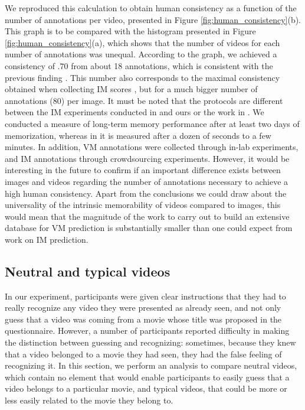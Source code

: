 \documentclass[sigconf]{acmart}
\begin{document}
We reproduced this calculation to obtain human consistency as a function of the number of annotations per video, presented in Figure \ref{fig:human_consistency}(b).
This graph is to be compared with the histogram presented in Figure \ref{fig:human_consistency}(a), which shows that the number of videos for each number of annotations was unequal.
According to the graph, we achieved a consistency of $.70$ from about 18 annotations, which is consistent with the previous finding \cite{han_2015_learning}.
This number also corresponds to the maximal consistency obtained when collecting IM scores \cite{isola_2011_makes,khosla_2015_understanding}, but for a much bigger number of annotations (80) per image.
It must be noted that the protocols are different between the IM experiments conducted in \cite{isola_2011_makes,khosla_2015_understanding} and ours or the work in \cite{han_2015_learning}.
We conducted a measure of long-term memory performance after at least two days of memorization, whereas in \cite{isola_2011_makes,khosla_2015_understanding} it is measured after a dozen of seconds to a few minutes. 
In addition, VM annotations were collected through in-lab experiments, and IM annotations through crowdsourcing experiments.
However, it would be interesting in the future to confirm if an important difference exists between images and videos regarding the number of annotations necessary to achieve a high human consistency.
Apart from the conclusions we could draw about the universality of the intrinsic memorability of videos compared to images, this would mean that the magnitude of the work to carry out to build an extensive database for VM prediction is substantially smaller than one could expect from work on IM prediction.

\subsection{Neutral and typical videos}
In our experiment, participants were given clear instructions that they had to really recognize any video they were presented as already seen, and not only guess that a video was coming from a movie whose title was proposed in the questionnaire.
However, a number of participants reported difficulty in making the distinction between guessing and recognizing: sometimes, because they knew that a video belonged to a movie they had seen, they had the false feeling of recognizing it.
In this section, we perform an analysis to compare neutral videos, which contain no element that would enable participants to easily guess that a video belongs to a particular movie, and typical videos, that could be more or less easily related to the movie they belong to.
\end{document}
